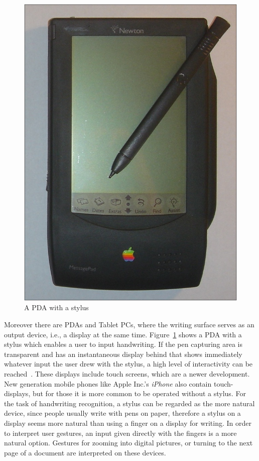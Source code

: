\begin{figure}[htbp]
\begin{center}
\includegraphics[scale=0.4]{images/AppleNewtonMP100.png}
\caption{A PDA with a stylus}
\label{fig:apdawithastylus}
\end{center}
\end{figure}

Moreover there are PDAs and Tablet PCs, where the writing surface serves 
as an output device, i.e., a display at the same time.
Figure~\ref{fig:apdawithastylus} shows a PDA with a stylus which enables
a user to input handwriting.
If the pen capturing area is transparent and has an instantaneous display behind
that shows immediately whatever input the user drew with the stylus,
a high level of interactivity can be reached~. 
These displays include touch screens, which are a newer development. 
New generation mobile phones like Apple Inc.'s \emph{iPhone} 
also contain touch-displays, but for those it is more common to be 
operated without a stylus. For the task of handwriting recognition, 
a stylus can be regarded as the more natural device, 
since people usually write with pens on paper,
therefore a stylus on a display seems more natural than using a 
finger on a display for writing. 
In order to interpret user gestures, an input given directly with the fingers
is a more natural option. Gestures for zooming into digital pictures, 
or turning to the next page of a document are interpreted on these devices.

